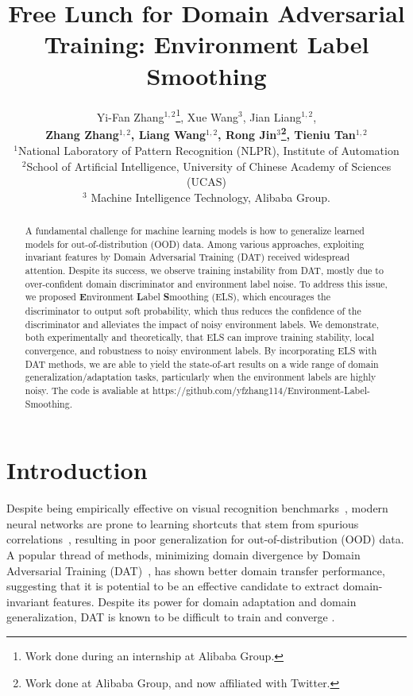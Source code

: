 \documentclass{article} \usepackage{iclr2023_conference,times}
\title{Free Lunch for Domain Adversarial Training: Environment Label Smoothing}
\author{Yi-Fan Zhang$^{1,2}$\thanks{Work done during an internship at Alibaba Group.}, Xue Wang$^3$, Jian Liang$^{1,2}$,
 \\ \textbf{Zhang Zhang$^{1,2}$, Liang Wang$^{1,2}$, Rong Jin$^{3}$\thanks{Work done at Alibaba Group, and now affiliated with Twitter.}, Tieniu Tan$^{1,2}$} \\
$^{1}$National Laboratory of Pattern Recognition (NLPR), Institute of Automation\\
$^{2}$School of Artificial Intelligence, University of Chinese Academy of Sciences (UCAS) \\
$^{3}$ Machine Intelligence Technology, Alibaba Group. 
}
\newcommand{\ls}[0]{ELS\xspace}
\begin{document}
\maketitle

\begin{abstract}
A fundamental challenge for machine learning models is how to generalize learned models for out-of-distribution (OOD) data. Among various approaches, exploiting invariant features by Domain Adversarial Training (DAT) received widespread attention. Despite its success, we observe training instability from DAT, mostly due to over-confident domain discriminator and environment label noise. To address this issue, we proposed \textbf{E}nvironment \textbf{L}abel \textbf{S}moothing (\ls), which  
encourages the discriminator to output soft probability, which thus reduces the confidence of the discriminator and alleviates the impact of noisy environment labels. We demonstrate, both experimentally and theoretically, that \ls can improve training stability, local convergence, and robustness to noisy environment labels. By incorporating \ls with DAT methods, we are able to yield the state-of-art results on a wide range of domain generalization/adaptation tasks, particularly when the environment labels are highly noisy. The code is avaliable at https://github.com/yfzhang114/Environment-Label-Smoothing.





\end{abstract}

\vspace{-0.1cm}
\section{Introduction} 
\vspace{-0.1cm}
Despite being empirically effective on visual recognition benchmarks~\citep{russakovsky2015imagenet}, modern neural networks are prone to learning shortcuts that stem from spurious correlations~\citep{Geirhos_2020}, resulting in poor generalization for out-of-distribution (OOD) data. A popular thread of methods, minimizing domain divergence by Domain Adversarial Training (DAT)~\citep{ganin2016domain}, has shown better domain transfer performance, suggesting that it is potential to be an effective candidate to extract domain-invariant features. Despite its power for domain adaptation and domain generalization, DAT is known to be difficult to train and converge \citep{roth2017stabilizing,jenni2019stabilizing,arjovsky2017towards,sonderby2016amortised}. 
\end{document}

